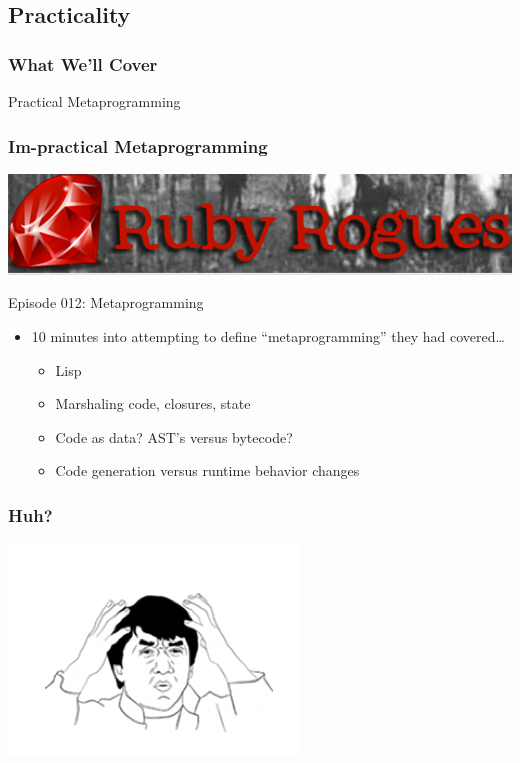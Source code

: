 \documentclass[slidestop,compress,mathserif]{beamer}
\begin{document}
\subsection{Practicality}

\begin{frame}
	\frametitle{What We'll Cover}
	\begin{center}
		Practical Metaprogramming
	\end{center}
\end{frame}

\begin{frame}
	\frametitle{\textbf{Im}-practical Metaprogramming}
	\pause
	\begin{center}
		\includegraphics[scale=0.3]{img/rubyrogues.png}
	\end{center}
	\vskip 0.25cm
	Episode 012:  Metaprogramming
	\vskip 0.25cm
	\begin{itemize}
		\pause
		\item 10 minutes into attempting to define ``metaprogramming'' they had covered{\ldots}
		\begin{itemize}
			\item Lisp
			\pause
			\item Marshaling code, closures, state 
			\pause
			\item Code as data?  AST's versus bytecode?
			\pause
			\item Code generation versus runtime behavior changes
		\end{itemize}
	\end{itemize}
\end{frame}

\begin{frame}
	\frametitle{Huh?}
	\begin{center}
		\includegraphics[scale=0.5]{img/chan.png}
	\end{center}
\end{frame}
\end{document}
